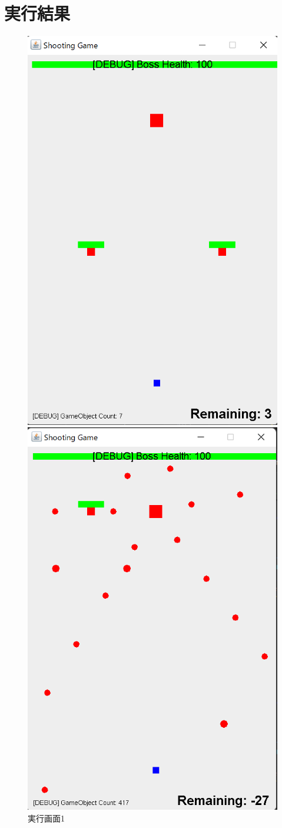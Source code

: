 \documentclass[dvipdfmx]{jlreq}
\begin{document}
\section{実行結果}

\begin{figure}[H]
\centering
\begin{minipage}[b]{0.32\columnwidth}
    \centering
    \includegraphics[width=0.7\columnwidth]{figures/result1.png}
    \caption{実行画面1}
    \label{fig:a}
\end{minipage}
\begin{minipage}[b]{0.32\columnwidth}
    \centering
    \includegraphics[width=0.7\columnwidth]{figures/result2.png}

\end{minipage}
\end{figure}
\end{document}
